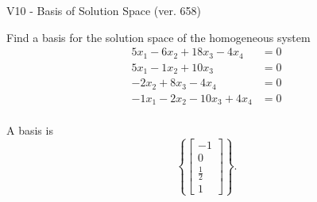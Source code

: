 \begin{exercise}
  \begin{exerciseTitle}V10 - Basis of Solution Space (ver. 658)\end{exerciseTitle}
  \begin{exerciseStatement}
    Find a basis for the solution space of the homogeneous system 
\begin{align*}
 5 x_ 1 -6 x_ 2 + 18 x_ 3 -4 x_ 4 &= 0  \\ 
  5 x_ 1 -1 x_ 2 + 10 x_ 3 &= 0  \\ 
  -2 x_ 2 + 8 x_ 3 -4 x_ 4 &= 0  \\ 
  -1 x_ 1 -2 x_ 2 -10 x_ 3 + 4 x_ 4 &= 0  \\ 
 \end{align*}


 
  \end{exerciseStatement}

  \begin{exerciseAnswer}
   A basis is   
\[\left\{\left[\begin{array}{c}
-1 \\
0 \\
\frac{1}{2} \\
1
\end{array}\right]\right\}.\]

  


  \end{exerciseAnswer}
\end{exercise}